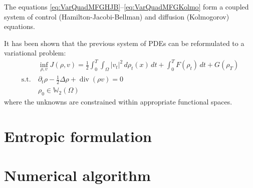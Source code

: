 \documentclass{article}
\newcommand{\WW}{\mathbb{W}}
\newcommand{\suchthat}{\mathrm{s.t.}}
\DeclareMathOperator{\divg}{div}
\begin{document}
    The equations \eqref{eq:VarQuadMFGHJB}--\eqref{eq:VarQuadMFGKolmo} form a coupled system of control (Hamilton-Jacobi-Bellman) and diffusion (Kolmogorov) equations.
    
    It has been shown that the previous system of PDEs can be reformulated to a variational problem:
    \begin{subequations}
    \begin{align}
    	&\inf_{\rho,v} J(\rho, v) =
    	\frac{1}{2}\int_0^T\int_\Omega |v_t|^2 \,d\rho_t(x)\,dt + \int_0^T F(\rho_t)\,dt + G(\rho_T)
    	\\
    	\suchthat\ &\partial_t \rho - \frac12\Delta \rho + \divg(\rho v) = 0 \\
    	&\rho_0 \in \WW_2(\Omega)	
    \end{align}
	\end{subequations}
	where the unknowns are constrained within appropriate functional spaces.



	\section{Entropic formulation}
    
    
    
    
    \section{Numerical algorithm}
    
    
    
    
    \printbibliography{}
    
    
    
    
    
\end{document}
